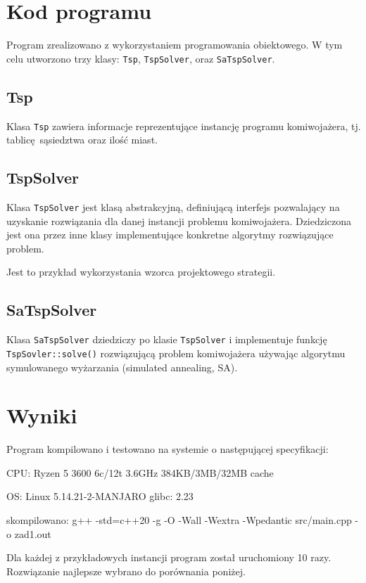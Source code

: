 \documentclass[a4paper]{article}
\begin{document}
\section{Kod programu}

Program zrealizowano z wykorzystaniem programowania obiektowego. W tym celu
utworzono trzy klasy: \verb|Tsp|, \verb|TspSolver|, oraz \verb|SaTspSolver|.

\subsection{Tsp}

Klasa \verb|Tsp| zawiera informacje reprezentujące instancję programu
komiwojażera, tj. tablicę sąsiedztwa oraz ilość miast.

\subsection{TspSolver}

Klasa \verb|TspSolver| jest klasą abstrakcyjną, definiującą interfejs
pozwalający na uzyskanie rozwiązania dla danej instancji problemu komiwojażera.
Dziedziczona jest ona przez inne klasy implementujące konkretne algorytmy
rozwiązujące problem.

Jest to przykład wykorzystania wzorca projektowego strategii.

\subsection{SaTspSolver}

Klasa \verb|SaTspSolver| dziedziczy po klasie \verb|TspSolver| i implementuje
funkcję \verb|TspSovler::solve()| rozwiązującą problem komiwojażera używając
algorytmu symulowanego wyżarzania (simulated annealing, SA).

\section{Wyniki}

Program kompilowano i testowano na systemie o następującej specyfikacji:

CPU: Ryzen 5 3600 6c/12t 3.6GHz 384KB/3MB/32MB cache

OS: Linux 5.14.21-2-MANJARO glibc: 2.23

skompilowano: g++ -std=c++20 -g -O -Wall -Wextra -Wpedantic src/main.cpp
-o zad1.out

Dla każdej z przykładowych instancji program został uruchomiony 10 razy.
Rozwiązanie najlepsze wybrano do porównania poniżej.
\end{document}
